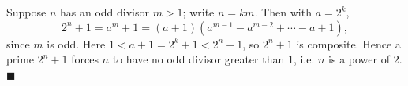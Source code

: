 Suppose $n$ has an odd divisor $m>1$; write $n=km$. Then with $a=2^k$,
\[2^n+1=a^m+1=(a+1)(a^{m-1}-a^{m-2}+\cdots-a+1),\]
since $m$ is odd. Here $1<a+1=2^k+1<2^n+1$, so $2^n+1$ is composite. Hence a prime $2^n+1$ forces $n$ to have no odd divisor greater than $1$, i.e. $n$ is a power of $2$. $\blacksquare$
